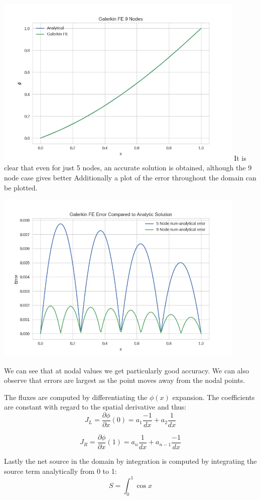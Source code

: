 \documentclass[11pt]{article}
\begin{document}
\includegraphics[width=12cm]{./figures/9nodes.png}
It is clear that even for just 5 nodes, an accurate solution is obtained, although the 9 node case gives better
Additionally a plot of the error throughout the domain can be plotted.

\includegraphics[width=12cm]{./figures/error.png}

We can see that at nodal values we get particularly good accuracy. We can also observe that errors are largest as the point moves away from the nodal points.

The fluxes are computed by differentiating the $\phi (x)$ expansion. The coefficients are constant with regard to the spatial derivative and thus:
\[
J_{L} = \frac{\partial \phi}{\partial x} (0) = a_{1} \frac{-1}{dx} + a_{2} \frac{1}{dx}  
\]

\[
J_{R} = \frac{\partial \phi}{\partial x} (1) = a_{n} \frac{1}{dx} + a_{n-1} \frac{-1}{dx} 
\]

Lastly the net source in the domain by integration is computed by integrating the source term analytically from 0 to 1:
\[
S = \int_{0}^{1} \cos x
\] 
\end{document}
